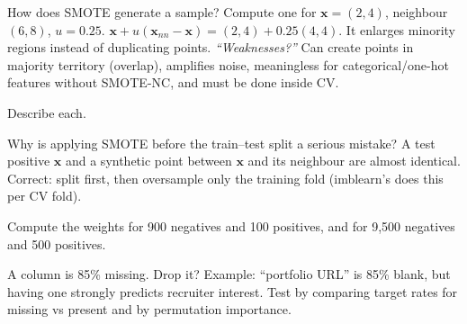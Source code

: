 \begin{qa}{ How does SMOTE generate a sample? Compute one for $\mathbf x = (2,4)$, neighbour $(6,8)$, $u = 0.25$.}
\why $\mathbf x + u(\mathbf x_{nn} - \mathbf x) = (2,4) + 0.25(4,4)$. It enlarges minority regions instead of duplicating points.
\pushes \emph{``Weaknesses?''} Can create points in majority territory (overlap), amplifies noise, meaningless for categorical/one-hot features
without SMOTE-NC, and must be done inside CV.
\end{qa}

\begin{qa}{ Describe each.}
\end{qa}

\begin{qa}{\deep Why is applying SMOTE before the train--test split a serious mistake?}
\why A test positive $\mathbf x$ and a synthetic point between $\mathbf x$ and its neighbour are almost identical. Correct: split first, then
oversample only the training fold (imblearn's  does this per CV fold).
\end{qa}

\begin{qa}{Compute the  weights for 900 negatives and 100 positives, and  for 9{,}500
negatives and 500 positives.}
\end{qa}

\begin{qa}{\deep A column is 85\% missing. Drop it?}
\why Example: ``portfolio URL'' is 85\% blank, but having one strongly predicts recruiter interest. Test by comparing target rates for missing vs
present and by permutation importance.
\end{qa}

